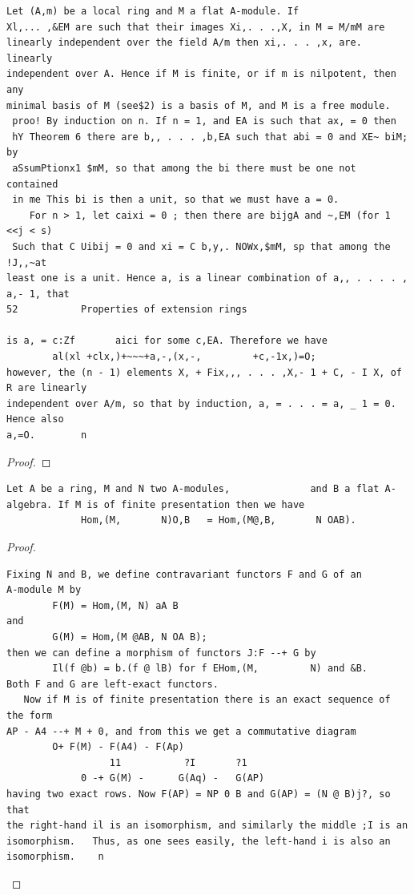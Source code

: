 \begin{theorem}\label{mcrt-auto-theorem-7-10}\uses{}
\begin{verbatim}
Let (A,m) be a local ring and M a flat A-module. If
Xl,... ,&EM are such that their images Xi,. . .,X, in M = M/mM are
linearly independent over the field A/m then xi,. . . ,x, are. linearly
independent over A. Hence if M is finite, or if m is nilpotent, then any
minimal basis of M (see$2) is a basis of M, and M is a free module.
 proo! By induction on n. If n = 1, and EA is such that ax, = 0 then
 hY Theorem 6 there are b,, . . . ,b,EA such that abi = 0 and XE~ biM; by
 aSsumPtionx1 $mM, so that among the bi there must be one not contained
 in me This bi is then a unit, so that we must have a = 0.
    For n > 1, let caixi = 0 ; then there are bijgA and ~,EM (for 1 <<j < s)
 Such that C Uibij = 0 and xi = C b,y,. NOWx,$mM, sp that among the !J,,~at
least one is a unit. Hence a, is a linear combination of a,, . . . . , a,- 1, that
52           Properties of extension rings

is a, = c:Zf       aici for some c,EA. Therefore we have
        al(xl +clx,)+~~~+a,-,(x,-,         +c,-1x,)=O;
however, the (n - 1) elements X, + Fix,,, . . . ,X,- 1 + C, - I X, of R are linearly
independent over A/m, so that by induction, a, = . . . = a, _ 1 = 0. Hence also
a,=O.        n
\end{verbatim}
\end{theorem}
\begin{proof}
\notready
\end{proof}


\begin{theorem}\label{mcrt-auto-theorem-7-11}\uses{}
\begin{verbatim}
Let A be a ring, M and N two A-modules,              and B a flat A-
algebra. If M is of finite presentation then we have
             Hom,(M,       N)O,B   = Hom,(M@,B,       N OAB).
\end{verbatim}
\end{theorem}
\begin{proof}
\begin{verbatim}
Fixing N and B, we define contravariant functors F and G of an
A-module M by
        F(M) = Hom,(M, N) aA B
and
        G(M) = Hom,(M @AB, N OA B);
then we can define a morphism of functors J:F --+ G by
        Il(f @b) = b.(f @ lB) for f EHom,(M,         N) and &B.
Both F and G are left-exact functors.
   Now if M is of finite presentation there is an exact sequence of the form
AP - A4 --+ M + 0, and from this we get a commutative diagram
        O+ F(M) - F(A4) - F(Ap)
                  11           ?I       ?1
             0 -+ G(M) -      G(Aq) -   G(AP)
having two exact rows. Now F(AP) = NP 0 B and G(AP) = (N @ B)j?, so that
the right-hand il is an isomorphism, and similarly the middle ;I is an
isomorphism.   Thus, as one sees easily, the left-hand i is also an
isomorphism.    n
\end{verbatim}
\end{proof}


